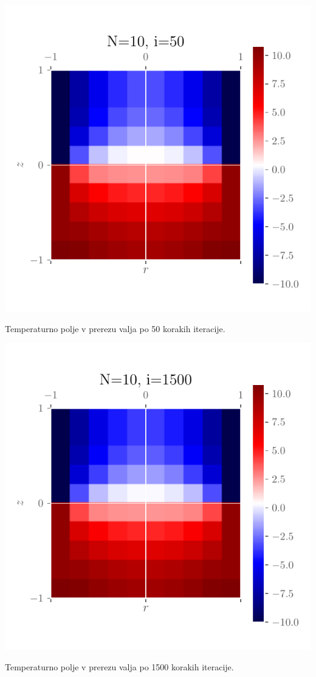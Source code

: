 \begin{center}
    \begin{minipage}{0.45\textwidth}
        \centering
    \includegraphics[width=\textwidth]{../old/2-valj-profili10_50.pdf}
    \caption{Temperaturno polje v prerezu valja po 50 korakih iteracije.}
    \end{minipage}\hfill
    \begin{minipage}{0.45\textwidth}
        \centering
    \includegraphics[width=\textwidth]{../old/2-valj-profili10_1500.pdf}
    \caption{Temperaturno polje v prerezu valja po 1500 korakih iteracije.}
    \end{minipage}
\end{center}

